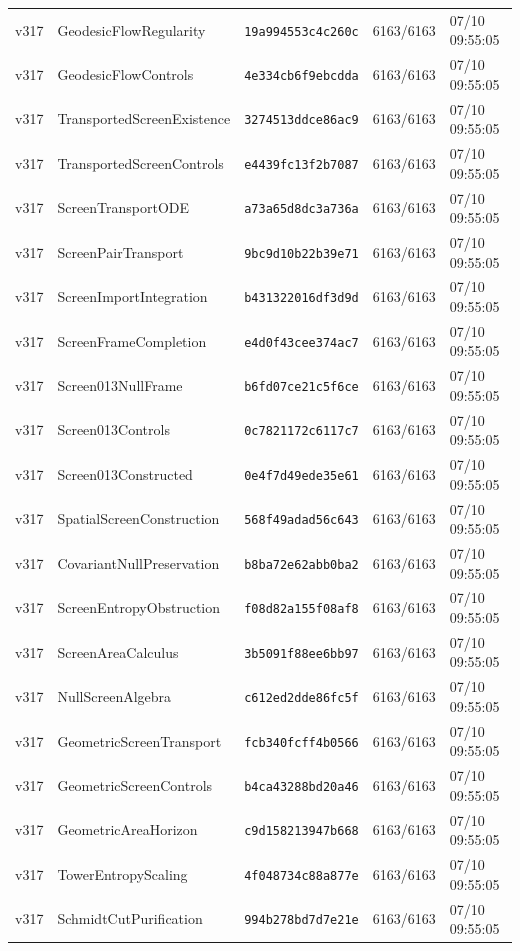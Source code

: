 \documentclass[11pt]{article}
\theoremstyle{definition}\newtheorem{deriv}{Derivação}
\begin{document}
{\begin{longtable}{@{}lllll@{}}
v317 & GeodesicFlowRegularity & \texttt{19a994553c4c260c} & 6163/6163 & 07/10 09:55:05 \\
v317 & GeodesicFlowControls & \texttt{4e334cb6f9ebcdda} & 6163/6163 & 07/10 09:55:05 \\
v317 & TransportedScreenExistence & \texttt{3274513ddce86ac9} & 6163/6163 & 07/10 09:55:05 \\
v317 & TransportedScreenControls & \texttt{e4439fc13f2b7087} & 6163/6163 & 07/10 09:55:05 \\
v317 & ScreenTransportODE & \texttt{a73a65d8dc3a736a} & 6163/6163 & 07/10 09:55:05 \\
v317 & ScreenPairTransport & \texttt{9bc9d10b22b39e71} & 6163/6163 & 07/10 09:55:05 \\
v317 & ScreenImportIntegration & \texttt{b431322016df3d9d} & 6163/6163 & 07/10 09:55:05 \\
v317 & ScreenFrameCompletion & \texttt{e4d0f43cee374ac7} & 6163/6163 & 07/10 09:55:05 \\
v317 & Screen013NullFrame & \texttt{b6fd07ce21c5f6ce} & 6163/6163 & 07/10 09:55:05 \\
v317 & Screen013Controls & \texttt{0c7821172c6117c7} & 6163/6163 & 07/10 09:55:05 \\
v317 & Screen013Constructed & \texttt{0e4f7d49ede35e61} & 6163/6163 & 07/10 09:55:05 \\
v317 & SpatialScreenConstruction & \texttt{568f49adad56c643} & 6163/6163 & 07/10 09:55:05 \\
v317 & CovariantNullPreservation & \texttt{b8ba72e62abb0ba2} & 6163/6163 & 07/10 09:55:05 \\
v317 & ScreenEntropyObstruction & \texttt{f08d82a155f08af8} & 6163/6163 & 07/10 09:55:05 \\
v317 & ScreenAreaCalculus & \texttt{3b5091f88ee6bb97} & 6163/6163 & 07/10 09:55:05 \\
v317 & NullScreenAlgebra & \texttt{c612ed2dde86fc5f} & 6163/6163 & 07/10 09:55:05 \\
v317 & GeometricScreenTransport & \texttt{fcb340fcff4b0566} & 6163/6163 & 07/10 09:55:05 \\
v317 & GeometricScreenControls & \texttt{b4ca43288bd20a46} & 6163/6163 & 07/10 09:55:05 \\
v317 & GeometricAreaHorizon & \texttt{c9d158213947b668} & 6163/6163 & 07/10 09:55:05 \\
v317 & TowerEntropyScaling & \texttt{4f048734c88a877e} & 6163/6163 & 07/10 09:55:05 \\
v317 & SchmidtCutPurification & \texttt{994b278bd7d7e21e} & 6163/6163 & 07/10 09:55:05 \\

\end{longtable}}
\end{document}
